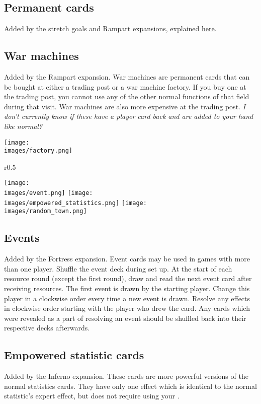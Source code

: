 \documentclass[12pt]{article}
\def\assets{assets}
\def\images{\assets/images}
\def\svgs{\assets/svgs}
\begin{document}
\subsection*{Permanent cards}
Added by the stretch goals and Rampart expansions, explained \hyperlink{Playerdecks}{here}.
\subsection*{War machines}
Added by the Rampart expansion. War machines are permanent cards that can be bought at either a trading post or a war machine factory. If you buy one at the trading post, you cannot use any of the other normal functions of that field during that visit. War machines are also more expensive at the trading post. \textit{I don't currently know if these have a player card back and are added to your hand like normal?}\par
\texttt{[image: \\images/factory.png]}

\clearpage
\begin{wrapfigure}{r}{0.5\textwidth}
    \begin{center}
    \texttt{[image: \\images/event.png]}
    \texttt{[image: \\images/empowered\_statistics.png]}
    \texttt{[image: \\images/random\_town.png]}
    \end{center}
\end{wrapfigure}
\subsection*{Events}
Added by the Fortress expansion. Event cards may be used in games with more than one player. Shuffle the event deck during set up. At the start of each resource round (except the first round), draw and read the next event card after receiving resources. The first event is drawn by the starting player. Change this player in a clockwise order every time a new event is drawn. Resolve any effects in clockwise order starting with the player who drew the card. Any cards which were revealed as a part of resolving an event should be shuffled back into their respective decks afterwards.
\subsection*{Empowered statistic cards}
Added by the Inferno expansion. These cards are more powerful versions of the normal statistics cards. They have only one effect which is identical to the normal statistic's expert effect, but does not require using your .
\end{document}
